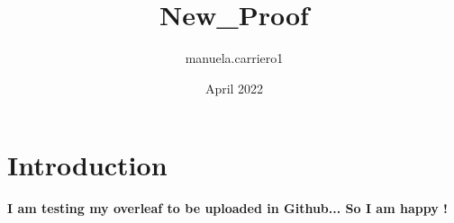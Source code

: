 \documentclass{article}
\title{New_Proof}
\author{manuela.carriero1 }
\date{April 2022}
\begin{document}
\maketitle

\section{Introduction}

\textbf{I am testing my overleaf to be uploaded in Github... So I am happy !}
\end{document}
